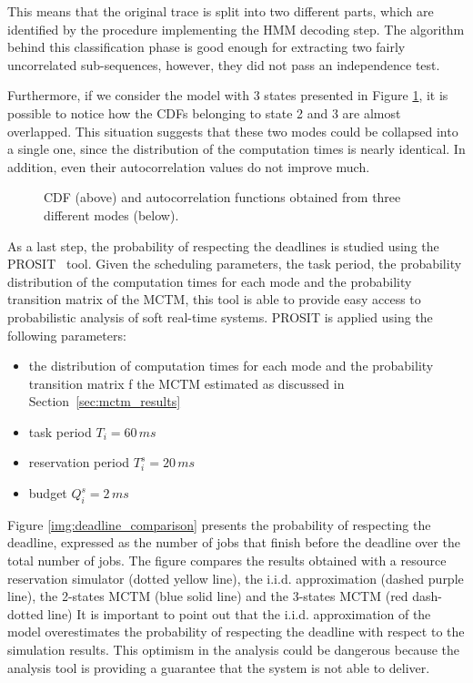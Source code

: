 This means that the original trace is split into two different parts, which
are identified by the procedure implementing the HMM decoding step. The algorithm
behind this classification phase is good enough for extracting two fairly
uncorrelated sub-sequences, however, they did not pass an independence test.

Furthermore, if we consider the model with 3 states presented in Figure
\ref{img:mctm_3_states}, it is possible to notice how the CDFs belonging to state
2 and 3 are almost overlapped. This situation suggests that these two
modes could be collapsed into a single one, since the distribution of the
computation times is nearly identical. In addition, even their autocorrelation
values do not improve much.
\begin{figure}[!htb]
    \caption{CDF (above) and autocorrelation functions obtained from three
        different modes (below).}
    \label{img:mctm_3_states}
\end{figure}

As a last step, the probability of respecting the deadlines is studied using the
PROSIT~\cite{palopoli2014tool} tool. Given the scheduling parameters, the task period, the
probability distribution of the computation times for each mode and the probability transition matrix of the MCTM, this tool is able to provide easy
access to probabilistic analysis of soft real-time systems. PROSIT is applied using
the following parameters:
\begin{itemize}
    \item the distribution of computation times for each mode and the probability transition matrix f the MCTM estimated as discussed in Section~\ref{sec:mctm_results}
    \item task period \( T_i = 60\,ms \)
    \item reservation period \( T_{i}^s = 20\,ms \)
    \item budget \( Q_{i}^s = 2\,ms \)
\end{itemize}

Figure \ref{img:deadline_comparison} presents the probability of respecting the deadline, expressed as the number of jobs that finish before the deadline over the total number of jobs. The figure compares the results obtained with a resource reservation simulator (dotted yellow line), the i.i.d.
approximation (dashed purple line), the 2-states MCTM (blue solid line) and the 3-states MCTM (red dash-dotted line) It is important to point out that the i.i.d. approximation of the model overestimates the probability of respecting
the deadline with respect to the simulation results. This optimism in the analysis could be dangerous because the analysis tool is providing a guarantee that the system is not able to deliver.

